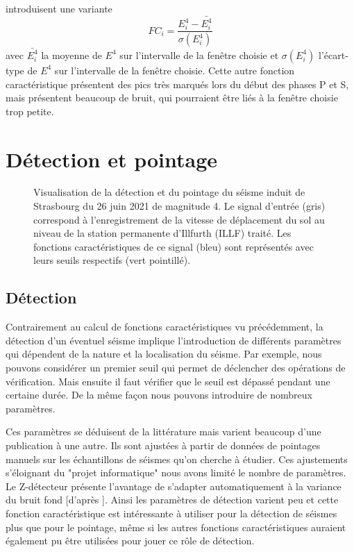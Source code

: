 \documentclass[a4paper, 11pt]{article} %
\begin{document}
\cite{baer1987} introduisent une variante 
\begin{equation}
   FC_i = \frac{E_i^4-\bar{E_i^4}}{\sigma(E_i^4)}
\end{equation}
avec $\bar{E_i^4}$ la moyenne de $E^4$ sur l'intervalle de la fenêtre choisie et $\sigma(E_i^4)$ l'écart-type de $E^4$ sur l'intervalle de la fenêtre choisie.
Cette autre fonction caractéristique présentent des pics très marqués lors du début des phases P et S, mais présentent beaucoup de bruit, qui pourraient être liés à la fenêtre choisie trop petite. 

\section{Détection et pointage}

\begin{figure}[ht]
    \centering
    \scalebox{.9}{}
    \caption{Visualisation de la détection et du pointage du séisme induit de Strasbourg du 26 juin 2021 de magnitude 4. Le signal d'entrée (gris) correspond à l'enregistrement de la vitesse de déplacement du sol au niveau de la station permanente d'Illfurth (ILLF) traité. Les fonctions caractéristiques de ce signal (bleu) sont représentés avec leurs seuils respectifs (vert pointillé).}
    \label{fig:pointage-strasbourg}
\end{figure}

\subsection{Détection}

Contrairement au calcul de fonctions caractéristiques vu précédemment, la détection d'un éventuel séisme implique l'introduction de différents paramètres qui dépendent de la nature et la localisation du séisme. Par exemple, nous pouvons considérer un premier seuil qui permet de déclencher des opérations de vérification. Mais ensuite il faut vérifier que le seuil est dépassé pendant une certaine durée. De la même façon nous pouvons introduire de nombreux paramètres.

Ces paramètres se déduisent de la littérature mais varient beaucoup d'une publication à une autre. Ils sont ajustées à partir de données de pointages manuels sur les échantillons de séismes qu'on cherche à étudier. Ces ajustements s'éloignant du "projet informatique" nous avons limité le nombre de paramètres. Le Z-détecteur présente l'avantage de s'adapter automatiquement à la variance du bruit fond [d'après \cite{wither1998}]. Ainsi les paramètres de détection varient peu et cette fonction caractéristique est intéressante à utiliser pour la détection de séismes plus que pour le pointage, même si les autres fonctions caractéristiques auraient également pu être utilisées pour jouer ce rôle de détection.
\end{document}
